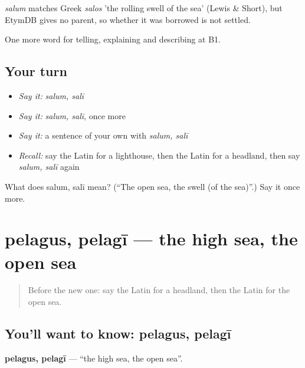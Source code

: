 \begin{cousinweb}
\emph{salum} matches Greek \emph{salos} 'the rolling swell of the sea' (Lewis \& Short), but EtymDB gives no parent, so whether it was borrowed is not settled.
\end{cousinweb}

\begin{grammarlens}[title={What you've built}]
One more word for telling, explaining and describing at B1.
\end{grammarlens}

\subsection*{Your turn}
\begin{itemize}
\raggedright
  \item \emph{Say it:} \emph{salum, salī}
  \item \emph{Say it:} \emph{salum, salī}, once more
  \item \emph{Say it:} a sentence of your own with \emph{salum, salī}
  \item \emph{Recall:} say the Latin for a lighthouse, then the Latin for a headland, then say \emph{salum, salī} again
\end{itemize}

\begin{tcolorbox}[breakable,colback=teal!4,colframe=teal!35!black,title={Before you move on}]
What does salum, salī mean? (\textquotedblleft{}The open sea, the swell (of the sea)\textquotedblright{}.) Say it once more.
\end{tcolorbox}
\section[pelagus, pelagī]{pelagus, pelagī — the high sea, the open sea}

\label{lesson:LA-C442-pelagus}



\begin{quote}
Before the new one: say the Latin for a headland, then the Latin for the open sea.
\end{quote}

\subsection*{You'll want to know: pelagus, pelagī}
\textbf{pelagus, pelagī} — \textquotedblleft{}the high sea, the open sea\textquotedblright{}.

